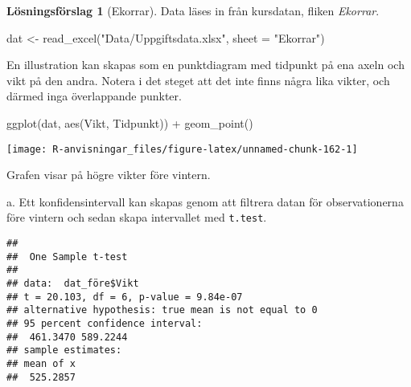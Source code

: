 \documentclass[
]{book}
\newenvironment{Shaded}{\begin{snugshade}}{\end{snugshade}}
\newcommand{\AttributeTok}[1]{\textcolor[rgb]{0.77,0.63,0.00}{#1}}
\newcommand{\FunctionTok}[1]{\textcolor[rgb]{0.00,0.00,0.00}{#1}}
\newcommand{\NormalTok}[1]{#1}
\newcommand{\OtherTok}[1]{\textcolor[rgb]{0.56,0.35,0.01}{#1}}
\newcommand{\SpecialCharTok}[1]{\textcolor[rgb]{0.00,0.00,0.00}{#1}}
\newcommand{\StringTok}[1]{\textcolor[rgb]{0.31,0.60,0.02}{#1}}
\theoremstyle{definition}
\theoremstyle{definition}
\theoremstyle{definition}
\theoremstyle{definition}
\newtheorem{hypothesis}{Lösningsförslag}[chapter]
\theoremstyle{remark}
\begin{document}
\begin{hypothesis}[Ekorrar]
Data läses in från kursdatan, fliken \emph{Ekorrar}.

\begin{Shaded}
\begin{Highlighting}[]
\NormalTok{dat }\OtherTok{\textless{}{-}} \FunctionTok{read\_excel}\NormalTok{(}\StringTok{"Data/Uppgiftsdata.xlsx"}\NormalTok{, }\AttributeTok{sheet =} \StringTok{"Ekorrar"}\NormalTok{)}
\end{Highlighting}
\end{Shaded}

En illustration kan skapas som en punktdiagram med tidpunkt på ena axeln och vikt på den andra. Notera i det steget att det inte finns några lika vikter, och därmed inga överlappande punkter.

\begin{Shaded}
\begin{Highlighting}[]
\FunctionTok{ggplot}\NormalTok{(dat, }\FunctionTok{aes}\NormalTok{(Vikt, Tidpunkt)) }\SpecialCharTok{+} \FunctionTok{geom\_point}\NormalTok{()}
\end{Highlighting}
\end{Shaded}

\begin{center}\texttt{[image: R-anvisningar\_files/figure-latex/unnamed-chunk-162-1]} \end{center}

Grafen visar på högre vikter före vintern.

a. Ett konfidensintervall kan skapas genom att filtrera datan för observationerna före vintern och sedan skapa intervallet med \texttt{t.test}.

\begin{Shaded}
\end{Shaded}

\begin{verbatim}
## 
##  One Sample t-test
## 
## data:  dat_före$Vikt
## t = 20.103, df = 6, p-value = 9.84e-07
## alternative hypothesis: true mean is not equal to 0
## 95 percent confidence interval:
##  461.3470 589.2244
## sample estimates:
## mean of x 
##  525.2857
\end{verbatim}


\end{hypothesis}
\end{document}
